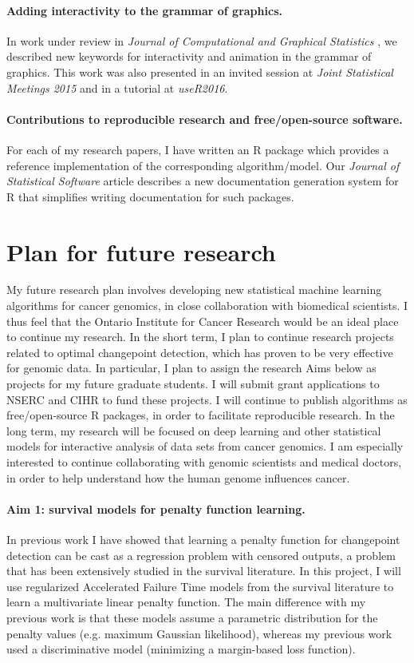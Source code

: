 \documentclass{article}
\begin{document}
\paragraph{Adding interactivity to the grammar of graphics.} In work
under review in \emph{Journal of Computational and Graphical
  Statistics} \citep{animint}, we described new keywords for
interactivity and animation in the grammar of graphics. This work was
also presented in an invited session at \emph{Joint Statistical
  Meetings 2015} and in a tutorial at \emph{useR2016}.

\paragraph{Contributions to reproducible research and free/open-source
  software.} For each of my research papers, I have written an R
package which provides a reference implementation of the corresponding
algorithm/model. Our \emph{Journal of Statistical Software} article
\citep{hocking13:inlinedocs} describes a new documentation generation
system for R that simplifies writing documentation for such packages.

\section{Plan for future research}

My future research plan involves developing new statistical machine
learning algorithms for cancer genomics, in close collaboration with
biomedical scientists. I thus feel that the Ontario Institute for
Cancer Research would be an ideal place to continue my research. In
the short term, I plan to continue research projects related to
optimal changepoint detection, which has proven to be very effective
for genomic data. In particular, I plan to assign the research Aims
below as projects for my future graduate students. I will submit grant
applications to NSERC and CIHR to fund these projects. I will
continue to publish algorithms as free/open-source R packages, in
order to facilitate reproducible research. In the long term, my
research will be focused on deep learning and other statistical models
for interactive analysis of data sets from cancer genomics. I am
especially interested to continue collaborating with genomic
scientists and medical doctors, in order to help understand how the
human genome influences cancer.

\paragraph{Aim 1: survival models for penalty function learning.} In
previous work I have showed that learning a penalty function for
changepoint detection can be cast as a regression problem with
censored outputs, a problem that has been extensively studied in the
survival literature. In this project, I will use regularized Accelerated Failure
Time models from the survival literature to learn a multivariate
linear penalty function. The main difference with my previous work is
that these models assume a parametric distribution for the penalty values
(e.g. maximum Gaussian likelihood), whereas my previous
work used a discriminative model (minimizing a margin-based loss
function).
\end{document}
